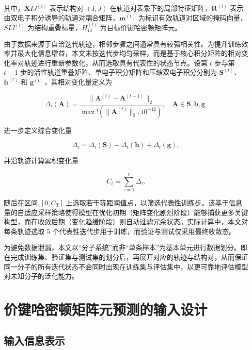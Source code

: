 其中，$\mathbf{X}{IJ}^{(t)}$ 表示结构对 $(I, J)$ 在轨道对表象下的局部特征矩阵，$\mathbf{R}^{(t)}$ 表示由双电子积分诱导的轨道对耦合矩阵，$\mathbf{m}^{(t)}$ 为标识有效轨道对区域的掩码向量，$S{IJ}^{(t)}$ 为结构重叠标量，$H_{IJ}^{(t)}$ 为目标价键哈密顿矩阵元。

由于数据来源于自洽迭代轨迹，相邻步骤之间通常具有较强相关性。为提升训练效率并最大化信息增益，本文未按迭代步均匀采样，而是基于核心积分矩阵的相对变化率对轨迹进行重新参数化，从而选取具有代表性的状态节点。设第 $t$ 步与第 $t-1$ 步的活性轨道重叠矩阵、单电子积分矩阵和压缩双电子积分分别为 $\mathbf{S}^{(t)}$、$\mathbf{h}^{(t)}$ 和 $\mathbf{g}^{(t)}$，其相对变化量定义为

\begin{equation}
\Delta_t(\mathbf{A}) = \frac{\lVert \mathbf{A}^{(t)} - \mathbf{A}^{(t-1)} \rVert_2}{\max!\left(\lVert \mathbf{A}^{(t)} \rVert_2, 10^{-12}\right)}, \quad \mathbf{A} \in {\mathbf{S}, \mathbf{h}, \mathbf{g}}.
\end{equation}

进一步定义综合变化量

\begin{equation}
\Delta_t = \Delta_t(\mathbf{S}) + \Delta_t(\mathbf{h}) + \Delta_t(\mathbf{g}),
\end{equation}

并沿轨迹计算累积变化量

\begin{equation}
C_t = \sum_{\tau=1}^{t} \Delta_\tau.
\end{equation}

随后在区间 $[0, C_T]$ 上选取若干等距阈值点，以筛选代表性训练步。该基于信息量的自适应采样策略使得模型在优化初期（矩阵变化剧烈阶段）能够捕获更多关键构型，而在收敛后期（变化趋缓阶段）则自动过滤冗余状态。实际计算中，本文对每条轨迹选取 5 个代表性迭代步用于训练，而验证与测试仅采用最终收敛态。

为避免数据泄漏，本文以“分子系统”而非“单条样本”为基本单元进行数据划分。即在完成训练集、验证集与测试集的划分后，再展开对应的轨迹与结构对，从而保证同一分子的所有迭代状态不会同时出现在训练集与评估集中，以更可靠地评估模型对未知分子的泛化能力。

\section{价键哈密顿矩阵元预测的输入设计}

\subsection{输入信息表示}

